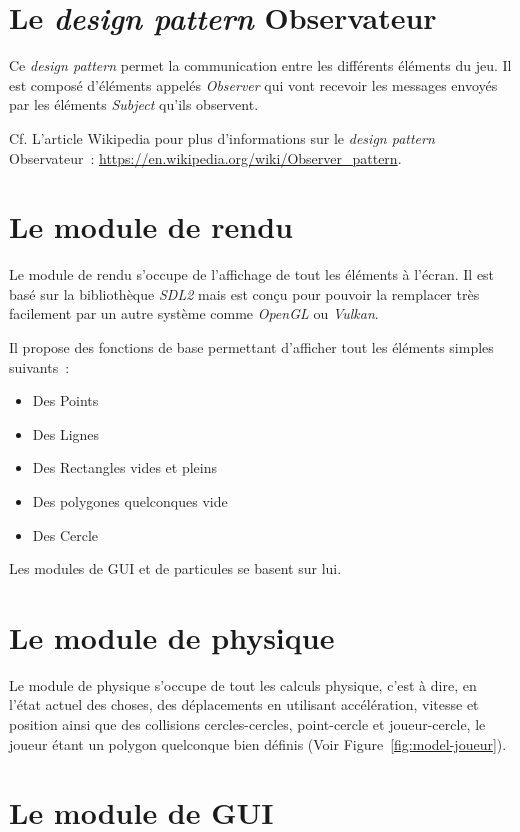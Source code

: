 \documentclass[10pt, french, a4paper]{report}
\begin{document}
\section{Le \textit{design pattern} Observateur}

Ce \textit{design pattern} permet la communication entre les différents éléments du
jeu. Il est composé d'éléments appelés \textit{Observer} qui vont \og recevoir \fg{} 
les messages envoyés par les éléments \textit{Subject} qu'ils observent.

Cf. L'article Wikipedia pour plus d'informations sur le \textit{design pattern}
Observateur~: \url{https://en.wikipedia.org/wiki/Observer_pattern}.

\section{Le module de rendu}

Le module de rendu s'occupe de l'affichage de tout les éléments à l'écran. Il est basé
sur la bibliothèque \textit{SDL2} mais est conçu pour pouvoir la remplacer très 
facilement par un autre système comme \textit{OpenGL} ou \textit{Vulkan}.

Il propose des fonctions de base permettant d'afficher tout les éléments simples 
suivants~:
\begin{itemize}
	\item Des Points
	\item Des Lignes
	\item Des Rectangles vides et pleins
	\item Des polygones quelconques vide
	\item Des Cercle
\end{itemize}

Les modules de GUI et de particules se basent sur lui.

\section{Le module de physique}

Le module de physique s'occupe de tout les calculs physique, c'est à dire, en l'état
actuel des choses, des déplacements en utilisant accélération, vitesse et position 
ainsi que des collisions cercles-cercles, point-cercle et joueur-cercle, le joueur
étant un polygon quelconque bien définis (Voir Figure~\ref{fig:model-joueur}).


\section{Le module de GUI}
\end{document}
